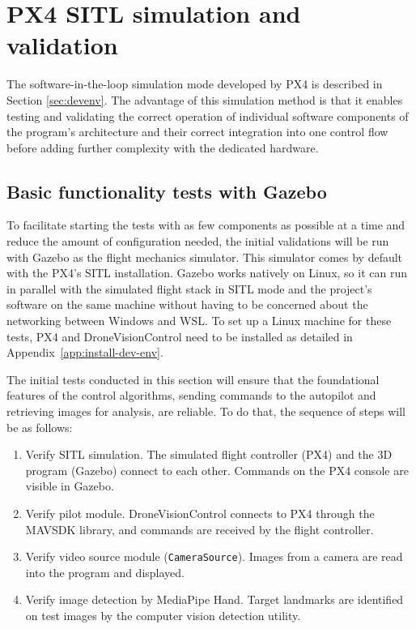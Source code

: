 \section{PX4 SITL simulation and validation}
\label{sec:test-2-sitl}

The software-in-the-loop simulation mode developed by PX4 is described in Section \ref{sec:devenv}. The advantage of this simulation method is that it enables testing and validating the correct operation of individual software components of the program's architecture and their correct integration into one control flow before adding further complexity with the dedicated hardware.

\subsection{Basic functionality tests with Gazebo}

To facilitate starting the tests with as few components as possible at a time and reduce the amount of configuration needed, the initial validations will be run with Gazebo \cite{gazebo-front} as the flight mechanics simulator. This simulator comes by default with the PX4's SITL installation. Gazebo works natively on Linux, so it can run in parallel with the simulated flight stack in SITL mode and the project's software on the same machine without having to be concerned about the networking between Windows and WSL. To set up a Linux machine for these tests, PX4 and DroneVisionControl need to be installed as detailed in Appendix~\ref{app:install-dev-env}.

The initial tests conducted in this section will ensure that the foundational features of the control algorithms, sending commands to the autopilot and retrieving images for analysis, are reliable.
To do that, the sequence of steps will be as follows:
\begin{enumerate}
    \item Verify SITL simulation. The simulated flight controller (PX4) and the 3D program (Gazebo) connect to each other. Commands on the PX4 console are visible in Gazebo.
    \item Verify pilot module. DroneVisionControl connects to PX4 through the MAVSDK library, and commands are received by the flight controller.
    \item Verify video source module (\texttt{CameraSource}). Images from a camera are read into the program and displayed.
    \item Verify image detection by MediaPipe Hand. Target landmarks are identified on test images by the computer vision detection utility.
\end{enumerate}

